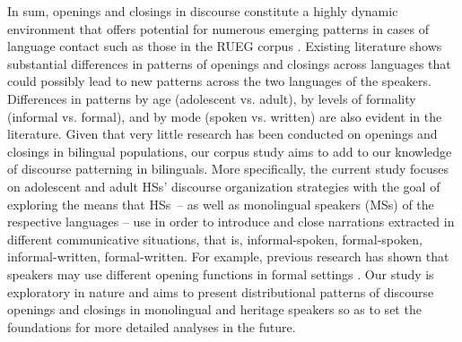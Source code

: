 \documentclass[output=paper,colorlinks,citecolor=brown]{langscibook}
\begin{document}
 In sum, openings and closings in discourse constitute a highly dynamic environment that offers potential for numerous emerging patterns in cases of language contact such as those in the RUEG corpus \parencite{wiese_heritage_2021}. Existing literature shows substantial differences in patterns of openings and closings across languages that could possibly lead to new patterns across the two languages of the speakers. Differences in patterns by age (adolescent vs. adult), by levels of formality (informal vs. formal), and by mode (spoken vs. written) are also evident in the literature. Given that very little research has been conducted on openings and closings in bilingual populations, our corpus study aims to add to our knowledge of discourse patterning in bilinguals. More specifically, the current study focuses on adolescent and adult HSs’ discourse organization strategies with the goal of exploring the means that HSs~-- as well as monolingual speakers (MSs) of the respective languages – use in order to introduce and close narrations extracted in different communicative situations, that is, informal-spoken, formal-spoken, informal-written, formal-written. For example, previous research has shown that speakers may use different opening functions in formal settings \parencite{Marquez_telephone_2010,zimmerman_interactional_1992,zimmerman_talk_1984}. Our study is exploratory in nature and aims to present distributional patterns of discourse openings and closings in monolingual and heritage speakers so as to set the foundations for more detailed analyses in the future.
 
\end{document}
